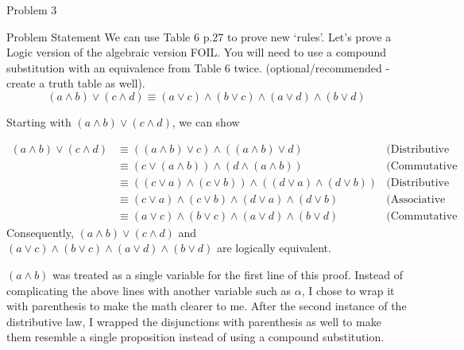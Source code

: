 \begin{problem}{Problem 3}
    \begin{statement}{Problem Statement}
        We can use Table 6 p.27 to prove new `rules'. Let’s prove a Logic version of the algebraic version FOIL. You will need to use a compound substitution with an equivalence from Table 6 twice. 
        (optional/recommended - create a truth table as well).
        \begin{equation*}
            (a \wedge b) \vee (c \wedge d) \equiv (a \vee c) \wedge (b \vee c) \wedge (a \vee d) \wedge (b \vee d)
        \end{equation*}
    \end{statement}

    \begin{highlight}[Solution]
        Starting with $(a \wedge b) \vee (c \wedge d)$, we can show

        \begin{align*}
            (a \wedge b) \vee (c \wedge d) & \equiv ((a \wedge b) \vee c) \wedge ((a \wedge b) \vee d) & \text{(Distributive Laws)} \\
            & \equiv (c \vee (a \wedge b)) \wedge (d \wedge (a \wedge b)) & \text{(Commutative Laws)} \\
            & \equiv ((c \vee a) \wedge (c \vee b)) \wedge ((d \vee a) \wedge (d \vee b)) & \text{(Distributive Laws)} \\
            & \equiv (c \vee a) \wedge (c \vee b) \wedge (d \vee a) \wedge (d \vee b) & \text{(Associative Laws)} \\
            & \equiv (a \vee c) \wedge (b \vee c) \wedge (a \vee d) \wedge (b \vee d) & \text{(Commutative Laws)}
        \end{align*}
        Consequently, $(a \wedge b) \vee (c \wedge d)$ and $(a \vee c) \wedge (b \vee c) \wedge (a \vee d) \wedge (b \vee d)$ are logically equivalent.

        $(a \wedge b)$ was treated as a single variable for the first line of this proof. Instead of complicating the above lines with another variable such as $\alpha$, I chose to wrap it with parenthesis
        to make the math clearer to me. After the second instance of the distributive law, I wrapped the disjunctions with parenthesis as well to make them resemble a single proposition instead of using a
        compound substitution.
    \end{highlight}
\end{problem}

